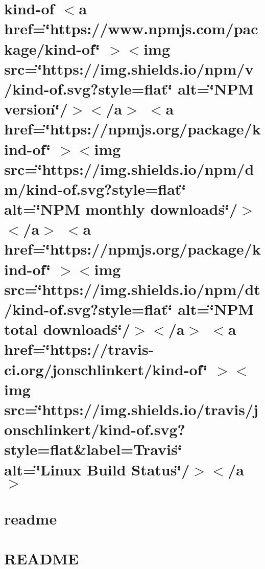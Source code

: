 \documentclass[twoside]{book}
\newcommand{\+}{\discretionary{\mbox{\scriptsize$\hookleftarrow$}}{}{}}
\begin{document}
\chapter{kind-\/of \texorpdfstring{$<$}{<}a href=\char`\"{}https\+://www.\+npmjs.\+com/package/kind-\/of\char`\"{} \texorpdfstring{$>$}{>}\texorpdfstring{$<$}{<}img src=\char`\"{}https\+://img.\+shields.\+io/npm/v/kind-\/of.\+svg?style=flat\char`\"{} alt=\char`\"{}\+NPM version\char`\"{}/\texorpdfstring{$>$}{>}\texorpdfstring{$<$}{<}/a\texorpdfstring{$>$}{>} \texorpdfstring{$<$}{<}a href=\char`\"{}https\+://npmjs.\+org/package/kind-\/of\char`\"{} \texorpdfstring{$>$}{>}\texorpdfstring{$<$}{<}img src=\char`\"{}https\+://img.\+shields.\+io/npm/dm/kind-\/of.\+svg?style=flat\char`\"{} alt=\char`\"{}\+NPM monthly downloads\char`\"{}/\texorpdfstring{$>$}{>}\texorpdfstring{$<$}{<}/a\texorpdfstring{$>$}{>} \texorpdfstring{$<$}{<}a href=\char`\"{}https\+://npmjs.\+org/package/kind-\/of\char`\"{} \texorpdfstring{$>$}{>}\texorpdfstring{$<$}{<}img src=\char`\"{}https\+://img.\+shields.\+io/npm/dt/kind-\/of.\+svg?style=flat\char`\"{} alt=\char`\"{}\+NPM total downloads\char`\"{}/\texorpdfstring{$>$}{>}\texorpdfstring{$<$}{<}/a\texorpdfstring{$>$}{>} \texorpdfstring{$<$}{<}a href=\char`\"{}https\+://travis-\/ci.\+org/jonschlinkert/kind-\/of\char`\"{} \texorpdfstring{$>$}{>}\texorpdfstring{$<$}{<}img src=\char`\"{}https\+://img.\+shields.\+io/travis/jonschlinkert/kind-\/of.\+svg?style=flat\&label=\+Travis\char`\"{} alt=\char`\"{}\+Linux Build Status\char`\"{}/\texorpdfstring{$>$}{>}\texorpdfstring{$<$}{<}/a\texorpdfstring{$>$}{>}}
\label{md__c___users_vaishnavi_jadhav__desktop__developer_code_mean_stack_example_client_node_modules_kind_of__r_e_a_d_m_e}

\chapter{readme}
\label{md__c___users_vaishnavi_jadhav__desktop__developer_code_mean_stack_example_client_node_modules_klona_readme}

\chapter{README}
\label{md__c___users_vaishnavi_jadhav__desktop__developer_code_mean_stack_example_client_node_modules_less_loader__r_e_a_d_m_e}

\end{document}
